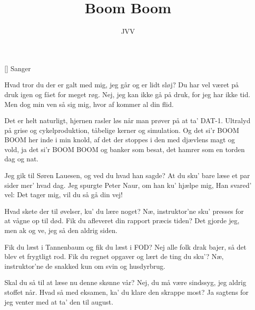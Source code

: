 \documentclass[a4paper,11pt]{article}
\title{Boom Boom}
\author{JVV}
\begin{document}
\maketitle

\begin{roles}
[] Sanger
\end{roles}

\begin{song}
Hvad tror du der er galt med mig, jeg går og er lidt sløj?
Du har vel været på druk igen og fået for meget røg.
Nej, jeg kan ikke gå på druk, for jeg har ikke tid.
Men dog min ven så sig mig, hvor af kommer al din flid.

Det er helt naturligt, hjernen rasler løs
når man prøver på at ta' DAT-1.
Ultralyd på grise og cykelproduktion,
tåbelige kerner og simulation.
Og det si'r BOOM BOOM her inde i min knold,
af det der stoppes i den med djævlens magt og vold,
ja det si'r BOOM BOOM og banker som besat,
det hamrer som en torden dag og nat.

Jeg gik til Søren Lauesen, og ved du hvad han sagde?
At du sku' bare læse et par sider mer' hvad dag.
Jeg spurgte Peter Naur, om han ku' hjælpe mig,
Han svared' vel: Det tager mig, vil du så gå din vej!

Hvad skete der til øvelser, ku' du lære noget?
Næ, instruktor'ne sku' presses for at vågne op til død.
Fik du afleveret din rapport præcis tiden?
Det gjorde jeg, men ak og ve, jeg så den aldrig siden.

Fik du læst i Tannenbaum og fik du læst i FOD?
Nej alle folk drak bajer, så det blev et frygtligt rod.
Fik du regnet opgaver og lært de ting du sku'?
Næ, instruktor'ne de snakked kun om svin og husdyrbrug.

Skal du så til at læse nu denne skønne vår?
Nej, du må være sindssyg, jeg aldrig stoffet når.
Hvad så med eksamen, ka' du klare den skrappe most?
Ja sagtens for jeg venter med at ta' den til august.
\end{song}
\end{document}
